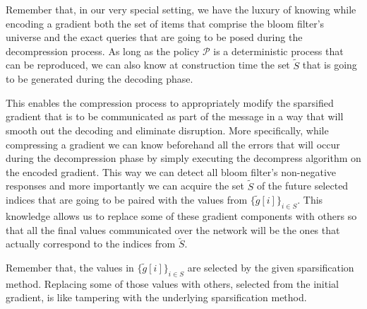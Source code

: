         Remember that, in our very special setting, we have the luxury of knowing while encoding a gradient both the set of items that comprise the bloom filter's universe and the exact queries that are going to be posed during the decompression process.
        As long as the policy $\mathcal{P}$ is a deterministic process that can be reproduced, we can also know at construction time the set $\tilde{S}$ that is going to be generated during the decoding phase.
        
        This enables the compression process to appropriately modify the sparsified gradient that is to be communicated as part of the message in a way that will smooth out the decoding and eliminate disruption.
        More specifically, while compressing a gradient we can
        know beforehand all the errors that will occur during the decompression phase by simply executing the decompress algorithm on the encoded gradient.
        This way we can detect all bloom filter's non-negative responses and more importantly we can acquire the set $\tilde{S}$ of the future selected indices that are going to be paired with the values from $\{\tilde{g}[i]\}_{i\in S}$.
        This knowledge allows us to replace some of these gradient components with others so that all the final values communicated over the network will be the ones that actually correspond to the indices from $\tilde{S}$.
        
        Remember that, the values in $\{\tilde{g}[i]\}_{i\in S}$ are selected by the given sparsification method.
        Replacing some of those values with others, selected from the initial gradient, is like tampering with the underlying sparsification method.
        
